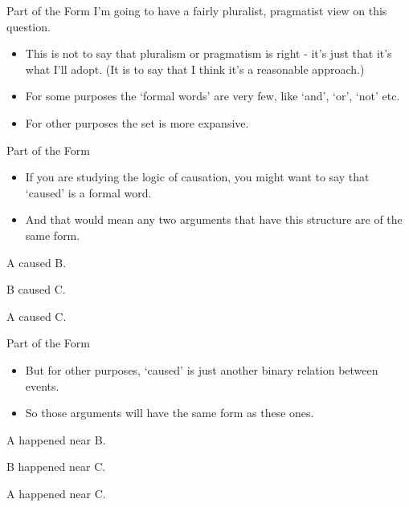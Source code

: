 \documentclass[
  ignorenonframetext,
]{beamer}
\providecommand{\tightlist}{%
  \setlength{\itemsep}{0pt}\setlength{\parskip}{0pt}}
\renewcommand{\,}{\text{, }}
\begin{document}
\begin{frame}{Part of the Form}
\protect\hypertarget{part-of-the-form}{}
I'm going to have a fairly pluralist, pragmatist view on this question.

\begin{itemize}
\tightlist
\item
  This is not to say that pluralism or pragmatism is right - it's just
  that it's what I'll adopt. (It is to say that I think it's a
  reasonable approach.)
\item
  For some purposes the `formal words' are very few, like `and', `or',
  `not' etc.
\item
  For other purposes the set is more expansive.
\end{itemize}
\end{frame}

\begin{frame}{Part of the Form}
\protect\hypertarget{part-of-the-form-1}{}
\begin{itemize}
\tightlist
\item
  If you are studying the logic of causation, you might want to say that
  `caused' is a formal word.
\item
  And that would mean any two arguments that have this structure are of
  the same form.
\end{itemize}

\begin{description}
\tightlist
\item[~]
A caused B.
\item[~]
B caused C.
\item[\(\therefore\)]
A caused C.
\end{description}
\end{frame}

\begin{frame}{Part of the Form}
\protect\hypertarget{part-of-the-form-2}{}
\begin{itemize}
\tightlist
\item
  But for other purposes, `caused' is just another binary relation
  between events.
\item
  So those arguments will have the same form as these ones.
\end{itemize}

\begin{description}
\tightlist
\item[~]
A happened near B.
\item[~]
B happened near C.
\item[\(\therefore\)]
A happened near C.
\end{description}
\end{frame}
\end{document}
